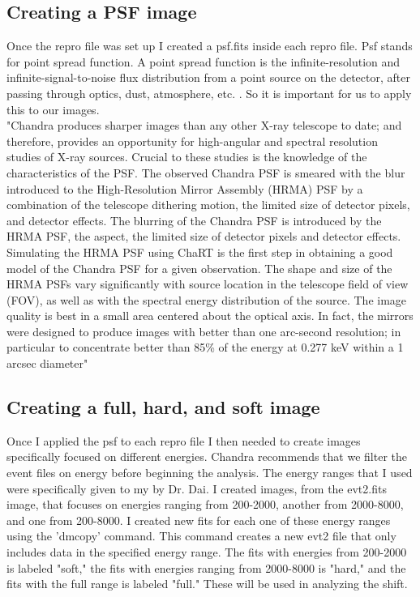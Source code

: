 \documentclass[12pt]{report}
\begin{document}
\subsection{Creating a PSF image}
Once the repro file was set up I created a psf.fits inside each repro file. Psf stands for point spread function. A point spread function is the infinite-resolution and infinite-signal-to-noise flux distribution from a point source on the detector, after passing through optics, dust, atmosphere, etc. \cite{Doe1_2023}. So it is important for us to apply this to our images.\\
"Chandra produces sharper images than any other X-ray telescope to date; and therefore, provides an opportunity for high-angular and spectral resolution studies of X-ray sources. Crucial to these studies is the knowledge of the characteristics of the PSF. The observed Chandra PSF is smeared with the blur introduced to the High-Resolution Mirror Assembly (HRMA) PSF by a combination of the telescope dithering motion, the limited size of detector pixels, and detector effects.\cite{Doe1_2023} The blurring of the Chandra PSF is introduced by the HRMA PSF, the aspect, the limited size of detector pixels and detector effects. Simulating the HRMA PSF using ChaRT is the first step in obtaining a good model of the Chandra PSF for a given observation. The shape and size of the HRMA PSFs vary significantly with source location in the telescope field of view (FOV), as well as with the spectral energy distribution of the source. The image quality is best in a small area centered about the optical axis. In fact, the mirrors were designed to produce images with better than one arc-second resolution; in particular to concentrate better than 85\% of the energy at 0.277 keV within a 1 arcsec diameter\cite{Chandra_2023}"\\

\subsection{Creating a full, hard, and soft image}
Once I applied the psf to each repro file I then needed to create images specifically focused on different energies. Chandra recommends that we filter the event files on energy before beginning the analysis. The energy ranges that I used were specifically given to my by Dr. Dai. I created images, from the evt2.fits image, that focuses on energies ranging from 200-2000, another from 2000-8000, and one from 200-8000. I created new fits for each one of these energy ranges using the 'dmcopy' command. This command creates a new evt2 file that only includes data in the specified energy range. The fits with energies from 200-2000 is labeled "soft," the fits with energies ranging from 2000-8000 is "hard," and the fits with the full range is labeled "full." These will be used in analyzing the shift.\cite{Doe_2023}
\end{document}
